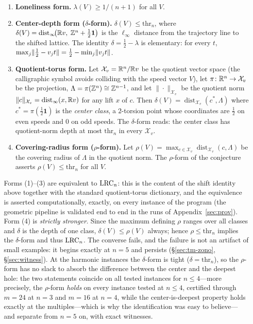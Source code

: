 \begin{enumerate}[leftmargin=1.6em,itemsep=2pt]
\item \textbf{Loneliness form.} $\lambda(V)\ge 1/(n+1)$ for all $V$.
\item \textbf{Center-depth form ($\delta$-form).}
$\delta(V)\le \mathrm{thr}_n$, where
$\delta(V)=\operatorname{dist}_\infty\!\bigl(\mathbb{R} v,\;\mathbb{Z}^n+\tfrac12\mathbf{1}\bigr)$
is the $\ell_\infty$ distance from the trajectory line to the shifted
lattice. The identity
$\delta=\tfrac12-\lambda$ is elementary: for every $t$,
$\max_j \lVert \tfrac12-v_jt \rVert=\tfrac12-\min_j\lVert v_jt \rVert$.
\item \textbf{Quotient-torus form.} Let $\mathcal{X}_v=\mathbb{R}^n/\mathbb{R} v$ be
the quotient vector space (the calligraphic symbol avoids colliding with
the speed vector $V$), let $\pi\colon\mathbb{R}^n\to\mathcal{X}_v$ be the
projection, $\Lambda=\pi(\mathbb{Z}^n)\cong\mathbb{Z}^{n-1}$, and let
$\|\cdot\|_{\mathcal{X}_v}$ be the quotient norm
$\|c\|_{\mathcal{X}_v}=\operatorname{dist}_\infty(x,\mathbb{R} v)$ for any lift
$x$ of $c$. Then $\delta(V)=\operatorname{dist}_{\mathcal{X}_v}(c^*,\Lambda)$
where $c^*=\pi(\tfrac12\mathbf{1})$ is the \emph{center class}, a
$2$-torsion point whose coordinates are $\tfrac12$ on even speeds and $0$
on odd speeds. The $\delta$-form reads: the center class has quotient-norm
depth at most $\mathrm{thr}_n$ in every $\mathcal{X}_v$.
\item \textbf{Covering-radius form ($\rho$-form).}
Let $\rho(V)=\max_{c\in\mathcal{X}_v}\operatorname{dist}_{\mathcal{X}_v}(c,
\Lambda)$ be the covering radius of $\Lambda$ in the quotient norm. The
$\rho$-form of the conjecture asserts $\rho(V)\le\mathrm{thr}_n$ for all
$V$.
\end{enumerate}

Forms (1)--(3) are equivalent to $\mathrm{LRC}_n$: this is the content of the
shift identity above together with the standard quotient-torus dictionary,
and the equivalence is asserted computationally, exactly, on every
instance of the program (the geometric pipeline is validated end to end
in the runs of Appendix~\ref{sec:prov}). Form (4) is \emph{strictly
stronger}. Since the maximum defining $\rho$ ranges over all classes and
$\delta$ is the depth of one class, $\delta(V)\le\rho(V)$ always; hence
$\rho\le\mathrm{thr}_n$ implies the $\delta$-form and thus $\mathrm{LRC}_n$. The
converse fails, and the failure is not an artifact of small examples: it
begins exactly at $n=5$ and persists (\S\ref{sec:tm-zono},
\S\ref{sec:witness}). At the harmonic instances the $\delta$-form is
tight ($\delta=\mathrm{thr}_n$), so the $\rho$-form has no slack to
absorb the difference between the center and the deepest hole: the
two statements coincide on all tested instances for $n\le 4$---more
precisely, the $\rho$-form \emph{holds} on every instance tested at
$n\le 4$, certified through $m=24$ at $n=3$ and $m=16$ at $n=4$, while
the center-is-deepest property holds exactly at the multiples---which is
why the identification was easy to believe---and separate from $n=5$ on,
with exact witnesses.

